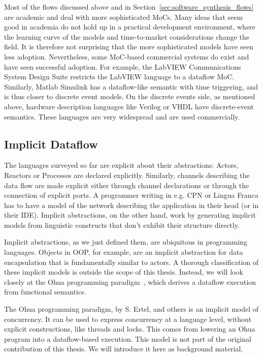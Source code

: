 Most of the flows discussed above and in Section~\ref{sec:software_synthesis_flows} are academic and deal with more sophisticated \acp{MoC}. 
Many ideas that seem good in academia do not hold up in a practical development environment, where the learning curve of the models and time-to-market considerations change the field.
It is therefore not surprising that the more sophisticated models have seen less adoption.
Nevertheless, some \ac{MoC}-based commercial systems do exist and have seen successful adoption.
For example, the LabVIEW Communications System Design Suite restricts the LabVIEW language to a dataflow \ac{MoC}.
Similarly, Matlab Simulink has a dataflow-like semantic with time triggering, and is thus closer to discrete event models.
On the discrete events side, as mentioned above, hardware description languages like Verilog or VHDL have discrete-event semantics.
These languages are very widespread and are used commercially.

\subsection{Implicit Dataflow}

The languages surveyed so far are explicit about their abstractions: Actors, Reactors or Processes are declared explicitly.
Similarly, channels describing the data flow are made explicit either through channel declarations or through the connection of explicit ports.
A programmer writing in e.g. \ac{CPN} or Lingua Franca has to have a model of the network describing the application in their head (or in their \acs{IDE}).
Implicit abstractions, on the other hand, work by generating implicit models from linguistic constructs that don't exhibit their structure directly.

Implicit abstractions, as we just defined them, are ubiquitous in programming languages.
Objects in \ac{OOP}, for example, are an implicit abstraction for data encapsulation that is fundamentally similar to actors.
A thorough classification  of these implicit models is outside the scope of this thesis.
Instead, we will look closely at the Ohua programming paradigm~\cite{ertel_phdthesis}, which derives a dataflow execution from functional semantics.

The Ohua programming paradigm, by S. Ertel, and others is an implicit model of concurrency. 
It can be used to express concurrency at a language level, without explicit constructions, like threads and locks. 
This comes from lowering an Ohua program into a dataflow-based execution.
This model is not part of the original contribution of this thesis.
We will introduce it here as background material.

